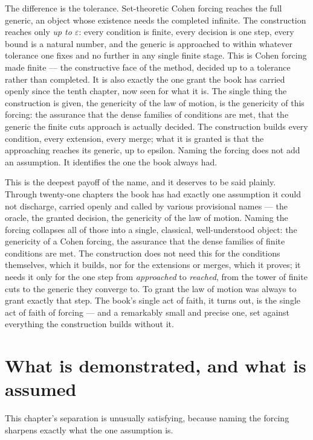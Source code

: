 The difference is the tolerance. Set-theoretic Cohen forcing reaches the full generic, an object whose
existence needs the completed infinite. The construction reaches only \emph{up to $\varepsilon$}: every
condition is finite, every decision is one step, every bound is a natural number, and the generic is
approached to within whatever tolerance one fixes and no further in any single finite stage. This is
Cohen forcing made finite --- the constructive face of the method, decided up to a tolerance rather than
completed. It is also exactly the one grant the book has carried openly since the tenth chapter, now
seen for what it is. The single thing the construction is given, the genericity of the law of motion, is
the genericity of this forcing: the assurance that the dense families of conditions are met, that the
generic the finite cuts approach is actually decided. The construction builds every condition, every
extension, every merge; what it is granted is that the approaching reaches its generic, up to epsilon.
Naming the forcing does not add an assumption. It identifies the one the book always had.

This is the deepest payoff of the name, and it deserves to be said plainly. Through twenty-one chapters
the book has had exactly one assumption it could not discharge, carried openly and called by various
provisional names --- the oracle, the granted decision, the genericity of the law of motion. Naming the
forcing collapses all of those into a single, classical, well-understood object: the genericity of a
Cohen forcing, the assurance that the dense families of finite conditions are met. The construction does
not need this for the conditions themselves, which it builds, nor for the extensions or merges, which it
proves; it needs it only for the one step from \emph{approached} to \emph{reached}, from the tower of
finite cuts to the generic they converge to. To grant the law of motion was always to grant exactly that
step. The book's single act of faith, it turns out, is the single act of faith of forcing --- and a
remarkably small and precise one, set against everything the construction builds without it.

\section{What is demonstrated, and what is assumed}
\label{se:demonstrated-assumed-ch22}

This chapter's separation is unusually satisfying, because naming the forcing sharpens exactly what the
one assumption is.

